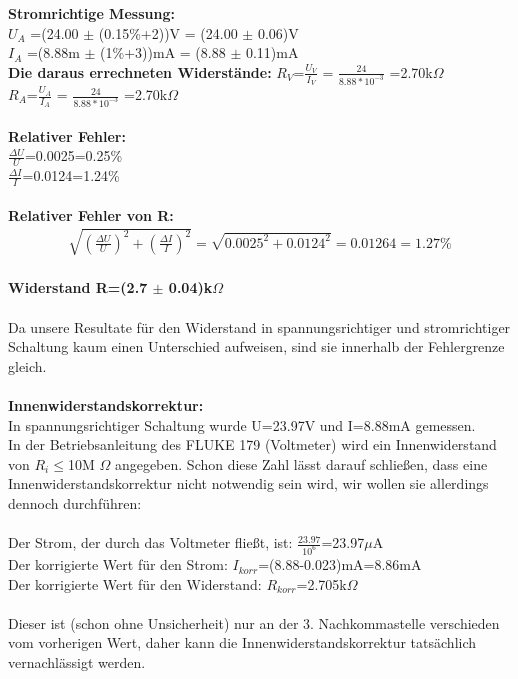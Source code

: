 \documentclass{article}
\begin{document}
\textbf{Stromrichtige Messung:}\\
$U_A$ =(24.00 $\pm$ (0.15\%+2))V = (24.00 $\pm$ 0.06)V\\
$I_A$ =(8.88m $\pm$ (1\%+3))mA = (8.88 $\pm$ 0.11)mA\\

\textbf{Die daraus errechneten Widerstände:}
$R_V$=$\frac{U_V}{I_V}$ = $\frac{24}{8.88*10^{-3}}$ =2.70k$\Omega$\\
$R_A$=$\frac{U_A}{I_A}$ = $\frac{24}{8.88*10^{-3}}$ =2.70k$\Omega$\\
\\
\textbf{Relativer Fehler:}\\
$\frac{\Delta U}{U}$=0.0025=0.25\%\\
$\frac{\Delta I}{I}$=0.0124=1.24\%\\
\\
\textbf{Relativer Fehler von R:}\\
\begin{gather}
\sqrt{(\frac{\Delta U}{U})^2+(\frac{\Delta I}{I})^2 }=\sqrt{0.0025^2+0.0124^2}=0.01264=1.27\%
\end{gather}
\\
\textbf{Widerstand R=(2.7 $\pm$ 0.04)k$\Omega$}\\
\\
Da unsere Resultate für den Widerstand in spannungsrichtiger und stromrichtiger Schaltung kaum einen Unterschied aufweisen, sind sie innerhalb der Fehlergrenze gleich.\\
\\
\textbf{Innenwiderstandskorrektur:}\\
In spannungsrichtiger Schaltung wurde U=23.97V und I=8.88mA gemessen.\\
In der Betriebsanleitung des FLUKE 179 (Voltmeter) wird ein Innenwiderstand von $R_i$$ \le $10M
$\Omega$ angegeben. Schon diese Zahl lässt darauf schließen, dass eine Innenwiderstandskorrektur nicht notwendig sein wird, wir wollen sie allerdings dennoch durchführen: \\
\\
Der Strom, der durch das Voltmeter fließt, ist: $\frac{23.97}{10^6}$=23.97$\mu$A\\
Der korrigierte Wert für den Strom: $I_{korr}$=(8.88-0.023)mA=8.86mA\\
Der korrigierte Wert für den Widerstand: $R_{korr}$=2.705k$\Omega$\\
\\
Dieser ist (schon ohne Unsicherheit) nur an der 3. Nachkommastelle verschieden vom vorherigen Wert, daher kann die Innenwiderstandskorrektur tatsächlich vernachlässigt werden.\\
\\
\end{document}
